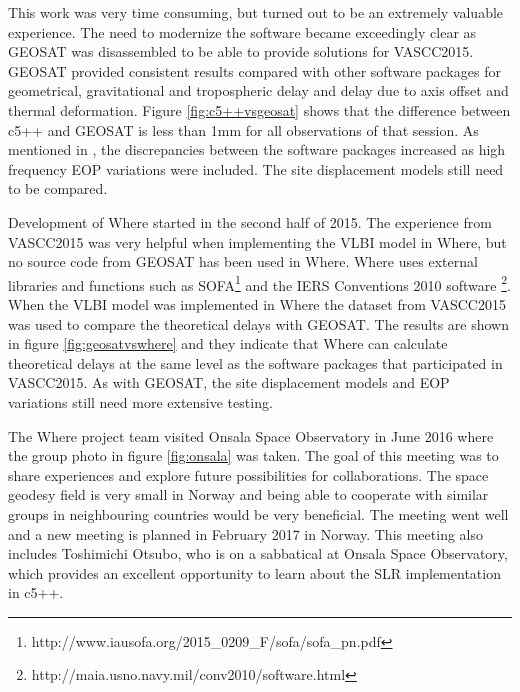 \documentclass[twocolumn,twoside]{svmultivs_br} %
\begin{document}
This work was very time consuming, but turned out to be an extremely valuable experience. The need to modernize the software became exceedingly clear as GEOSAT was disassembled to be able to provide solutions for VASCC2015. GEOSAT provided consistent results compared with other software packages for geometrical, gravitational and tropospheric delay and delay due to axis offset and thermal deformation. Figure \ref{fig:c5++vsgeosat} shows that the difference between c5++ and GEOSAT is less than 1mm for all observations of that session. As mentioned in \cite{vascc2015}, the discrepancies between the software packages increased as high frequency EOP variations were included. The site displacement models still need to be compared. 

Development of Where started in the second half of 2015. The experience from VASCC2015 was very helpful when implementing the VLBI model in Where, but no source code from GEOSAT has been used in Where. Where uses external libraries and functions such as SOFA\footnote{http://www.iausofa.org/2015\_0209\_F/sofa/sofa\_pn.pdf} and the IERS Conventions 2010 software \footnote{http://maia.usno.navy.mil/conv2010/software.html}. When the VLBI model was implemented in Where the dataset from VASCC2015 was used to compare the theoretical delays with GEOSAT. The results are shown in figure \ref{fig:geosatvswhere} and they indicate that Where can calculate theoretical delays at the same level as the software packages that participated in VASCC2015. As with GEOSAT, the site displacement models and EOP variations still need more extensive testing. 

The Where project team visited Onsala Space Observatory in June 2016 where the group photo in figure \ref{fig:onsala} was taken. The goal of this meeting was to share experiences and explore future possibilities for collaborations. The space geodesy field is very small in Norway and being able to cooperate with similar groups in neighbouring countries would be very beneficial. The meeting went well and a new meeting is planned in February 2017 in Norway. This meeting also includes Toshimichi Otsubo, who is on a sabbatical at Onsala Space Observatory, which provides an excellent opportunity to learn about the SLR implementation in c5++.
\end{document}
